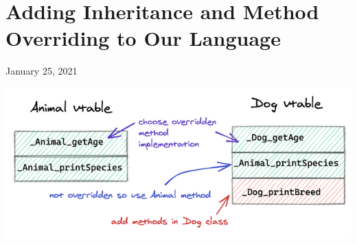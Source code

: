 %
%
%
%
%
%

\hypertarget{top-of-page}{%
\chapter{Adding Inheritance and Method Overriding to Our
Language}\label{top-of-page}}

January 25, 2021

%

\includegraphics[width=\linewidth]{11_files/vtable.png}

